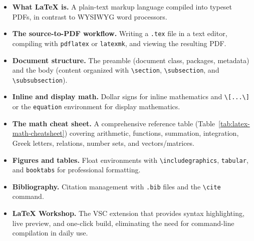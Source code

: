 \begin{itemize}
    \item \textbf{What \LaTeX{} is.} A plain-text markup language
          compiled into typeset PDFs, in contrast to WYSIWYG word
          processors.
    \item \textbf{The source-to-PDF workflow.} Writing a
          \texttt{.tex} file in a text editor, compiling with
          \texttt{pdflatex} or \texttt{latexmk}, and viewing the
          resulting PDF.
    \item \textbf{Document structure.} The preamble (document class,
          packages, metadata) and the body (content organized with
          \verb|\section|, \verb|\subsection|, and
          \verb|\subsubsection|).
    \item \textbf{Inline and display math.} Dollar signs for inline
          mathematics and \verb|\[...\]| or the \texttt{equation}
          environment for display mathematics.
    \item \textbf{The math cheat sheet.} A comprehensive reference
          table (Table~\ref{tab:latex-math-cheatsheet}) covering
          arithmetic, functions, summation, integration, Greek
          letters, relations, number sets, and vectors/matrices.
    \item \textbf{Figures and tables.} Float environments with
          \verb|\includegraphics|, \texttt{tabular}, and
          \texttt{booktabs} for professional formatting.
    \item \textbf{Bibliography.} Citation management with
          \texttt{.bib} files and the \verb|\cite| command.
    \item \textbf{LaTeX Workshop.} The VSC extension that provides
          syntax highlighting, live preview, and one-click build,
          eliminating the need for command-line compilation in daily
          use.
\end{itemize}
